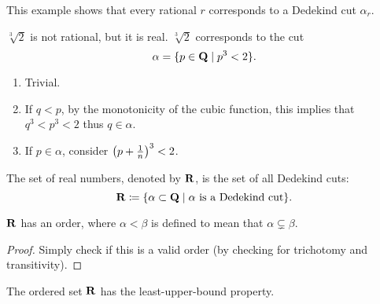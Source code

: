 This example shows that every rational $r$ corresponds to a Dedekind cut $\alpha_r$.

\begin{example}
$\sqrt[3]{2}$ is not rational, but it is real. $\sqrt[3]{2}$ corresponds to the cut
\[ \alpha=\{p\in\mathbf Q\mid p^3<2\}. \]
\begin{enumerate}[label=(\roman*)]
\item Trivial.
\item If $q<p$, by the monotonicity of the cubic function, this implies that $q^3<p^3<2$ thus $q\in\alpha$.
\item If $p\in\alpha$, consider $\left(p+\frac{1}{n}\right)^3<2$.
\end{enumerate}
\end{example}

\begin{definition}
The set of real numbers, denoted by $\mathbf R$, is the set of all Dedekind cuts:
\[\mathbf R\coloneqq\{\alpha\subset\mathbf Q\mid\alpha\text{ is a Dedekind cut}\}.\]
\end{definition}

\begin{proposition}
$\mathbf R$ has an order, where $\alpha<\beta$ is defined to mean that $\alpha\subsetneq\beta$.
\end{proposition}

\begin{proof}
Simply check if this is a valid order (by checking for trichotomy and transitivity).
\end{proof}

\begin{proposition}
The ordered set $\mathbf R$ has the least-upper-bound property.
\end{proposition}

